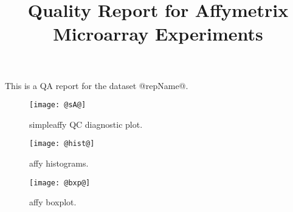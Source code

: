 \documentclass{article}
\begin{document}
\title{Quality Report for Affymetrix Microarray Experiments}

\maketitle

This is a QA report for the dataset @repName@.

\begin{figure}[tp]
  \centering
\texttt{[image: @sA@]}

\caption{\label{fig:sA}%
simpleaffy QC diagnostic plot.}
\end{figure}

\begin{figure}[tp]
  \centering
\texttt{[image: @hist@]}

\caption{\label{fig:sA}%
affy histograms.}
\end{figure}

\begin{figure}[tp]
  \centering
\texttt{[image: @bxp@]}

\caption{\label{fig:sA}%
affy boxplot.}
\end{figure}
\end{document}
